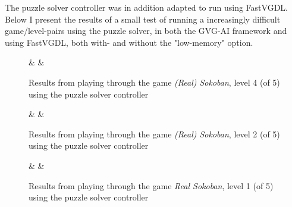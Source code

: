 \documentclass[a4paper,titlepage,final]{report}
\begin{document}
The puzzle solver controller was in addition adapted to run using FastVGDL.
Below I present the results of a small test of running a increasingly difficult game/level-pairs using the puzzle solver, in both the GVG-AI framework and using FastVGDL, both with- and without the "low-memory" option.

\begin{figure}[!ht]
\centering
{}%
{\Framwork & \Time & \Space}%
\caption{Results from playing through the game \textit{(Real) Sokoban}, level 4 (of 5) using the puzzle solver controller}
\label{table:fastvgdlsokoban3}
\end{figure}

 \begin{figure}[!ht]
\centering
{}%
{\Framwork & \Time & \Space}%
\caption{Results from playing through the game \textit{(Real) Sokoban}, level 2 (of 5) using the puzzle solver controller}\label{table:fastvgdlsokoban1}
\end{figure}

 \begin{figure}[!ht]
\centering
{}%
{\Framwork & \Time & \Space}%
\caption{Results from playing through the game \textit{Real Sokoban}, level 1 (of 5) using the puzzle solver controller}\label{table:fastvgdlthecitadel4}
\end{figure}
\end{document}
